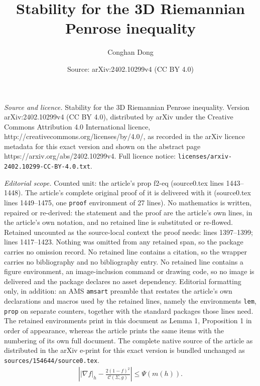 \documentclass[10pt,a4paper]{amsart}
\title{Stability for the 3D Riemannian Penrose inequality}
\author{Conghan Dong}
\date{Source: arXiv:2402.10299v4 (CC BY 4.0)}
\begin{document}
\maketitle

\noindent\emph{Source and licence.} Stability for the 3D Riemannian Penrose inequality. Version arXiv:2402.10299v4 (CC BY 4.0), distributed by arXiv under the Creative Commons Attribution 4.0 International licence, http://creativecommons.org/licenses/by/4.0/, as recorded in the arXiv licence metadata for this exact version and shown on the abstract page https://arxiv.org/abs/2402.10299v4. Full licence notice: \texttt{licenses/arxiv-2402.10299-CC-BY-4.0.txt}.\par\smallskip

\noindent\textit{Editorial scope.} Counted unit: the article's prop f2-eq (source0.tex lines 1443--1448). The article's complete original proof of it is delivered with it (source0.tex lines 1449--1475, one \texttt{proof} environment of 27 lines). No mathematics is written, repaired or re-derived: the statement and the proof are the article's own lines, in the article's own notation, and no retained line is substituted or re-flowed.  Retained uncounted as the source-local context the proof needs: lines 1397--1399; lines 1417--1423.  Nothing was omitted from any retained span, so the package carries no omission record.  No retained line contains a citation, so the wrapper carries no bibliography and no bibliography entry.  No retained line contains a figure environment, an image-inclusion command or drawing code, so no image is delivered and the package declares no asset dependency.  Editorial formatting only, in addition: an AMS \texttt{amsart} preamble that restates the article's own declarations and macros used by the retained lines, namely the environments \texttt{lem}, \texttt{prop} on separate counters, together with the standard packages those lines need.  The retained environments print in this document as Lemma 1, Proposition 1 in order of appearance, whereas the article prints the same items with the numbering of its own full document.  The complete native source of the article as distributed in the arXiv e-print for this exact version is bundled unchanged as \texttt{sources/154644/source0.tex}.
\begin{align}\label{grad-f}
\left| |\nabla f|_h -  \frac{2(1-f)^2}{\mathcal{C}(\Sigma ,g)} \right| \leq \Psi (m(h) ).	
\end{align}
\end{document}

